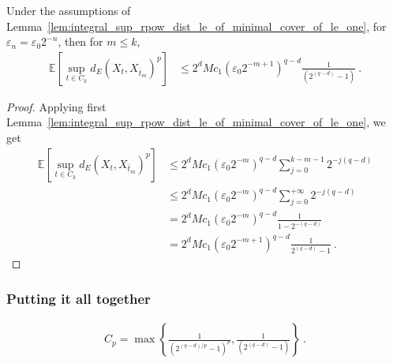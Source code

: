 \begin{corollary}\label{cor:integral_sup_rpow_dist_le_of_minimal_cover_two_of_le_one}
  \leanok
Under the assumptions of Lemma~\ref{lem:integral_sup_rpow_dist_le_of_minimal_cover_of_le_one}, for $\varepsilon_n = \varepsilon_0 2^{-n}$, then for $m \le k$,
\begin{align*}
  \mathbb{E} \left[\sup_{t \in C_k} d_E(X_t, X_{\bar{t}_m})^p \right]
  &\le 2^d M c_1 (\varepsilon_0 2^{-m + 1})^{q - d} \frac{1}{\left( 2^{(q -d)} - 1\right)}
  \: .
\end{align*}
\end{corollary}

\begin{proof}
Applying first Lemma~\ref{lem:integral_sup_rpow_dist_le_of_minimal_cover_of_le_one}, we get
\begin{align*}
  \mathbb{E} \left[\sup_{t \in C_k} d_E(X_t, X_{\bar{t}_m})^p \right]
  &\le 2^d M c_1 (\varepsilon_0 2^{-m})^{q-d}\sum_{j=0}^{k-m-1} 2^{- j (q - d)}
  \\
  &\le 2^d M c_1 (\varepsilon_0 2^{-m})^{q-d}\sum_{j=0}^{+\infty} 2^{- j (q - d)}
  \\
  &= 2^d M c_1 (\varepsilon_0 2^{-m})^{q-d} \frac{1}{1 - 2^{-(q - d)}}
  \\
  &= 2^d M c_1 (\varepsilon_0 2^{-m+1})^{q-d} \frac{1}{2^{(q - d)} - 1}
  \: .
\end{align*}
\end{proof}



\subsubsection{Putting it all together}

\begin{definition}\label{def:Cp}
  \leanok
\begin{align*}
  C_p = \max\left\{\frac{1}{\left( 2^{(q -d)/p} - 1\right)^p}, \frac{1}{\left( 2^{(q -d)} - 1\right)} \right\}
  \: .
\end{align*}
\end{definition}



